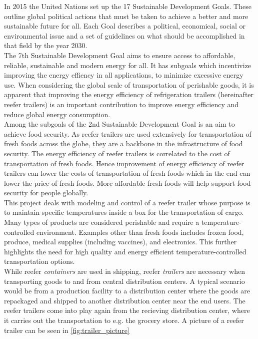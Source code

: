 In 2015 the United Nations set up the 17 Sustainable Development Goals. These outline global political actions that must be taken to achieve a better and more sustainable future for all. Each Goal describes a political, economical, social or environmental issue and a set of guidelines on what should be accomplished in that field by the year 2030.\\

The 7th Sustainable Development Goal\cite{UNdev_goal7} aims to ensure access to affordable, reliable, sustainable and modern energy for all. It has subgoals which incentivize improving the energy effiency in all applications, to minimize excessive energy use. When considering the global scale of transportation of perishable goods, it is apparent that improving the energy efficiency of refrigeration trailers (hereinafter reefer trailers) is an important contribution to improve energy efficiency and reduce global energy consumption. \\


Among the subgoals of the 2nd Sustainable Development Goal \cite{UNdev_goal2} is an aim to achieve food security. As reefer trailers are used extensively for transportation of fresh foods across the globe, they are a backbone in the infrastructure of food security. The energy efficiency of reefer trailers is correlated to the cost of transportation of fresh foods. Hence improvement of energy efficiency of reefer trailers can lower the costs of transportation of fresh foods which in the end can lower the price of fresh foods. More affordable fresh foods will help support food security for people globally.\\


This project deals with modeling and control of a reefer trailer whose purpose is to maintain specific temperatures inside a box for the transportation of cargo. Many types of products are considered perishable and require  a temperature-controlled environment. Examples other than fresh foods includes frozen food, produce, medical supplies (including vaccines), and electronics. This further highlights the need for high quality and energy efficient temperature-controlled transportation options. \\
While reefer \textit{containers} are used in shipping, reefer \textit{trailers} are necessary when transporting goods to and from central distribution centers. A typical scenario would be from a production facility to a distribution center where the goods are repackaged and shipped to another distribution center near the end users. The reefer trailers come into play again from the recieving distribution center,  where it carries out the transportation to e.g. the grocery store. A picture of a reefer trailer can be seen in \cref{fig:trailer_picture}

